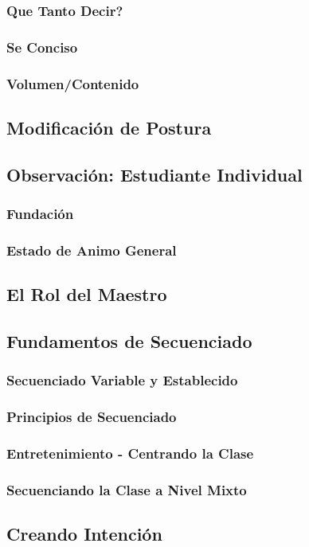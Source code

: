 \documentclass[a4paper]{article}
\begin{document}
\subsubsection{Que Tanto Decir?}
\subsubsection{Se Conciso}
\subsubsection{Volumen/Contenido}
\subsection{Modificación de Postura}
\subsection{Observación: Estudiante Individual}
\subsubsection{Fundación}
\subsubsection{Estado de Animo General}
\subsection{El Rol del Maestro}
\subsection{Fundamentos de Secuenciado}
\subsubsection{Secuenciado Variable y Establecido}
\subsubsection{Principios de Secuenciado}
\subsubsection{Entretenimiento - Centrando la Clase}
\subsubsection{Secuenciando la Clase a Nivel Mixto}
\subsection{Creando Intención}
\end{document}
